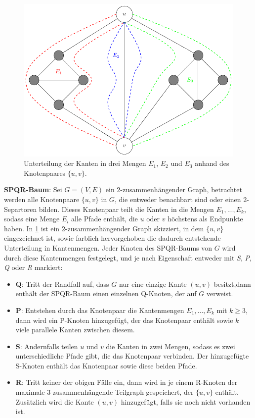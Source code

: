 \begin{figure}[H]
  \centering
  \includegraphics[width=\textwidth,height=\textheight,keepaspectratio]{bilder/Split-Kantenmengen.pdf}
  \caption{Unterteilung der Kanten in drei Mengen $E_1$, $E_2$ und $E_3$ anhand des Knotenpaares $\{u, v\}$.}
  \label{fig:Split-Kantenmengen}
\end{figure}

\textbf{SPQR-Baum}: Sei $G = (V, E)$ ein $2$-zusammenhängender Graph, betrachtet werden alle Knotenpaare $\{u, v\}$ in $G$, die entweder benachbart sind oder einen $2$-Separtoren bilden.
Dieses Knotenpaar teilt die Kanten in die Mengen $E_1, ..., E_k$, sodass eine Menge $E_i$ alle Pfade enthält, die $u$ oder $v$ höchstens als Endpunkte haben.
In \Abb \ref{fig:Split-Kantenmengen} ist ein $2$-zusammenhängender Graph skizziert, in dem $\{u, v\}$ eingezeichnet ist, sowie farblich hervorgehoben die dadurch entstehende Unterteilung in Kantenmengen.
Jeder Knoten des SPQR-Baums von $G$ wird durch diese Kantenmengen festgelegt, und je nach Eigenschaft entweder mit \textit{S}, \textit{P}, \textit{Q} oder \textit{R} markiert:
\begin{itemize}
  \item \textbf{Q}: Tritt der Randfall auf, dass $G$ nur eine einzige Kante $(u, v)$ besitzt,dann enthält der SPQR-Baum einen einzelnen Q-Knoten, der auf $G$ verweist.
  \item \textbf{P}: Entstehen durch das Knotenpaar die Kantenmengen $E_1, ..., E_k$ mit $k \geq 3$, dann wird ein P-Knoten hinzugefügt, der das Knotenpaar enthält sowie $k$ viele parallele Kanten zwischen diesem.
  \item \textbf{S}: Andernfalls teilen $u$ und $v$ die Kanten in zwei Mengen, sodass es zwei unterschiedliche Pfade gibt, die das Knotenpaar verbinden.
                    Der hinzugefügte S-Knoten enthält das Knotenpaar sowie diese beiden Pfade.
  \item \textbf{R}: Tritt keiner der obigen Fälle ein, dann wird in je einem R-Knoten der maximale $3$-zusammenhängende Teilgraph gespeichert, der $\{u, v\}$ enthält.
                    Zusätzlich wird die Kante $(u, v)$ hinzugefügt, falls sie noch nicht vorhanden ist.
\end{itemize}

